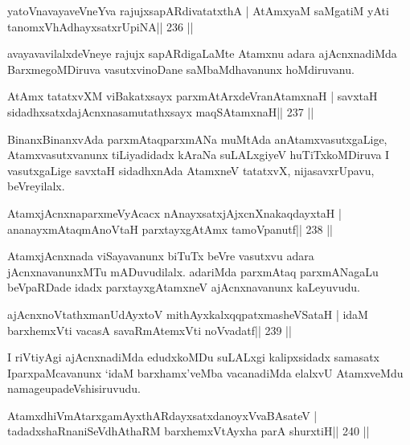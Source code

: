 \begin{shl}
yatoV\s navayaveVneYva rajujxsapARdivatatxthA |
AtAmx\s yaM saMgatiM yAti tanomxVhAdhayxsatxrUpiNA\hfill || 236 ||
\end{shl}

\begin{shl}
avayavavilalxdeVneye rajujx sapARdigaLaMte Atamxnu adara ajAcnxnadiMda BarxmegoMDiruva vasutxvinoDane saMbaMdhavanunx hoMdiruvanu.
\end{shl}


\begin{shl}
AtAmx tatatxvXM viBakatxsayx parxmAtArxdeVranAtamxnaH |
savxtaH sidadhxsatxdajAcnxnasamutathxsayx maqSAtamxnaH\hfill || 237 ||
\end{shl}

\begin{artha}
BinanxBinanxvAda parxmAtaqparxmANa muMtAda anAtamxvasutxgaLige, Atamxvasutxvanunx tiLiyadidadx kAraNa suLALxgiyeV huTiTxkoMDiruva I vasutxgaLige savxtaH sidadhxnAda AtamxneV tatatxvX, nijasavxrUpavu, beVreyilalx.
\end{artha}

\begin{shl}
AtamxjAcnxnaparxmeVyAcacx nAnayxsatxjAjxcnXnakaqdayxtaH |
ananayxmAtaqmAnoV\s taH parxtayxgAtAmx tamoVpanutf\hfill || 238 ||
\end{shl}

\begin{artha}
AtamxjAcnxnada viSayavanunx biTuTx beVre vasutxvu adara jAcnxnavanunxMTu mADuvudilalx. adariMda parxmAtaq parxmANagaLu beVpaRDade idadx parxtayxgAtamxneV ajAcnxnavanunx kaLeyuvudu.
\end{artha}

\begin{shl}
ajAcnxnoVtathxmanUdAyxtoV mithAyxkalxqqpatxmasheVSataH |
idaM barxhemxVti vacasA savaRmAtemxVti noV\s vadatf\hfill || 239 ||
\end{shl}

\begin{artha}
I riVtiyAgi ajAcnxnadiMda edudxkoMDu suLALxgi kalipxsidadx samasatx I\break parxpaMcavanunx `idaM barxhamx'veMba vacanadiMda elalxvU AtamxveMdu namage\break upadeVshisiruvudu.
\end{artha}


\begin{shl}
AtamxdhiVmAtarxgamAyxthARdayxsatxdanoyxV\s vaBAsateV |
tadadxshaRnaniSeVdhAthaRM barxhemxVtAyxha parA shurxtiH\hfill || 240 ||
\end{shl}

